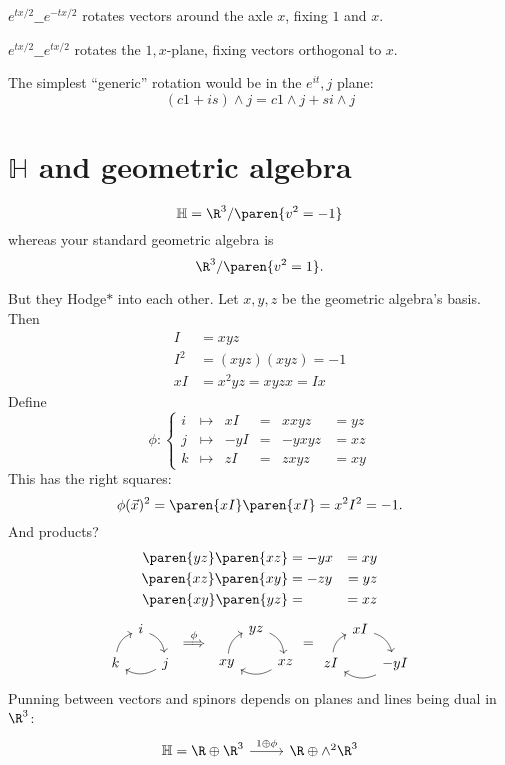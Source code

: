 \documentclass{scrartcl}
\newcommand{\ham}{\mathbb H}
\renewcommand{\blank}{\_\_}
\begin{document}
\begin{multicols*}{2}
\(e^{tx/2}\blank e^{-tx/2}\) rotates vectors around the axle \(x\), fixing \(1\) and \(x\).

\(e^{tx/2}\blank e^{tx/2}\) rotates the \(1,x\)-plane, fixing vectors orthogonal to \(x\).

The simplest ``generic'' rotation would be in the \(e^{it},j\)  plane:
\[
  (c1+is) \wedge j = c1\wedge j + s i \wedge j
\]
\section{\(\ham\) and geometric algebra}
\[
  \ham = \R^3/\paren{v^2=-1}
\]
whereas your standard geometric algebra is
\[
  \R^3/\paren{v^2=1}.
\]

But they Hodge\(*\) into each other. Let \(x,y,z\) be the geometric algebra's basis. Then
\begin{align*}
  I &= xyz  \\
  I^2 &= (xyz)(xyz) = -1 \\
  xI &= x^2yz = xyzx = Ix
\end{align*}
Define
\[
  \phi:
  \left\{
  \begin{matrix}
    i &\mapsto& xI &=&xxyz&= yz    \\
    j &\mapsto& -yI&=&-yxyz&= xz  \\
    k &\mapsto& zI &=&zxyz&= xy
  \end{matrix}
  \right.
\]
This has the right squares:
\[
  \phi(\vec x)^2 = \paren{xI}\paren{xI} = x^2I^2 = -1.
\]
And products?
\begin{align*}
  \paren{yz}\paren{xz} &= -yx &= xy \\
  \paren{xz}\paren{xy} &= -zy &=yz \\
  \paren{xy}\paren{yz} &= &=xz
\end{align*}
\[
  \begin{tikzcd}[row sep=1em,column sep = .5em]
    & i \ar[bend left]{dr}\\
    k\ar[bend left]{ur} & &j \ar[bend left]{ll}
  \end{tikzcd}
  \overset{\phi}{\implies}
  \begin{tikzcd}[row sep=1em,column sep = .4ex]
    & yz \ar[bend left]{dr}\\
    xy\ar[bend left]{ur} & &xz \ar[bend left]{ll}
  \end{tikzcd}
  =
  \begin{tikzcd}[row sep=1em,column sep = .4ex]
    & xI \ar[bend left]{dr}\\
    zI\ar[bend left]{ur} & &-yI \ar[bend left]{ll}
  \end{tikzcd}
\]
Punning between vectors and spinors depends on planes and lines being dual in \(\R^3\):
\[
  \begin{tikzcd}
    \ham = \R \oplus \R^3 \rar{1\oplus \phi}& \R\oplus \wedge^2\R^3
  \end{tikzcd}
\]

\end{multicols*}
\end{document}
